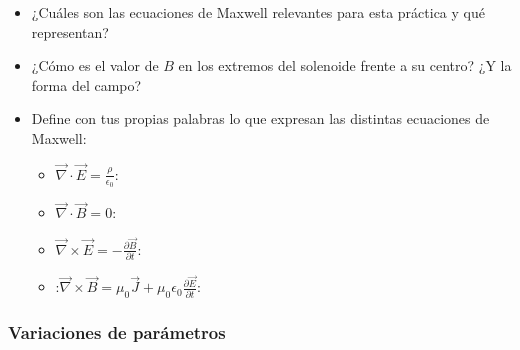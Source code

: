 \begin{itemize}
    \item ¿Cuáles son las ecuaciones de Maxwell relevantes para esta práctica y qué representan?
    \vspace{3cm}
    \item ¿Cómo es el valor de \(B\) en los extremos del solenoide frente a su centro? ¿Y la forma del campo?
    \vspace{3cm}
    \item Define con tus propias palabras lo que expresan las distintas ecuaciones de Maxwell:
    \begin{itemize}
        \item \(\vec{\nabla}\cdot \vec{E}= \frac{\rho}{\epsilon_0}\):
        \vspace{1cm}
        \item \(\vec{\nabla}\cdot \vec{B}=0\): 
        \vspace{1cm}
        \item \(\vec{\nabla}\times\vec{E}=-\frac{\partial\vec{B}}{\partial t}\):
        \vspace{1cm}
        \item:\(\vec{\nabla}\times \vec{B}=\mu_0\vec{J}+\mu_0\epsilon_0\frac{\partial \vec{E}}{\partial t}\):
        \vspace{1cm}
    \end{itemize}
\end{itemize}

\subsubsection*{Variaciones de parámetros}

